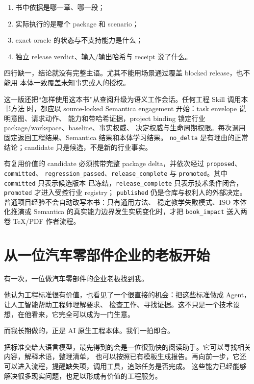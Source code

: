 \begin{enumerate}
\item 书中依据是哪一章、哪一段；
\item 实际执行的是哪个 package 和 scenario；
\item exact oracle 的状态与不支持能力是什么；
\item 独立 release verdict、输入/输出哈希与 receipt 说了什么。
\end{enumerate}

四行缺一，结论就没有完整主语。尤其不能用场景通过覆盖 blocked release，也不能用
本体一致覆盖未知事实或人的授权。

这一版还把“怎样使用这本书”从查阅升级为语义工作会话。任何工程 Skill 调用本书方法
时，都应以 source-locked Semantica engagement 开始：task envelope 说明意图、请求动作、
能力和带哈希证据，project binding 锁定行业 package/workspace、baseline、事实权威、
决定权威与生命周期权限。每次调用固定返回工程结果、Semantica 结果和本体学习结果。
\nolinkurl{no_delta} 是有理由的正常结论；candidate 只是候选，不是新的行业事实。

有复用价值的 candidate 必须携带完整 package delta，并依次经过 \nolinkurl{proposed}、\nolinkurl{committed}、
\nolinkurl{regression_passed}、\nolinkurl{release_complete} 与 \nolinkurl{promoted}。其中 \nolinkurl{committed} 只表示候选版本
已冻结，\nolinkurl{release_complete} 只表示技术条件闭合，\nolinkurl{promoted} 才进入受控行业 registry；
\nolinkurl{published} 仍是仓库与权利人的外部决定。普通项目经验不会自动改写本书：只有通用方法、
稳定教学失败模式、ISO 本体化推演或 Semantica 的真实能力边界发生实质变化时，才把
\nolinkurl{book_impact} 送入两卷 TeX/PDF 作者流程。

\section*{从一位汽车零部件企业的老板开始}

有一次，一位做汽车零部件的企业老板找到我。

他认为工程标准很有价值，也看见了一个很直接的机会：把这些标准做成 Agent，让人工智能帮助工程师理解要求、
检查工作、寻找证据。这不只是一个技术设想，在他看来，它完全可以成为一门生意。

而我长期做的，正是 AI 原生工程本体。我们一拍即合。

把标准交给大语言模型，最先得到的会是一位很勤快的阅读助手。它可以寻找相关内容，解释术语，整理清单，
也可以按照已有模板生成报告。再向前一步，它还可以进入流程，提醒缺失项，调用工具，追踪任务是否完成。
这些能力已经能够解决很多现实问题，也足以形成有价值的工程服务。

